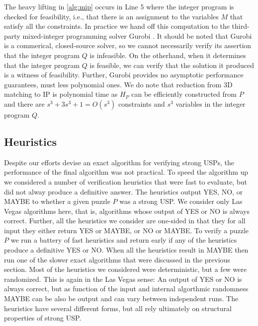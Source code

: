 \documentclass[11pt]{article}
\begin{document}
The heavy lifting in \autoref{alg:mip} occurs in Line 5 where the
integer program is checked for feasibility, i.e., that there is an
assignment to the variables $M$ that satisfy all the constraints.  In
practice we hand off this computation to the third-party mixed-integer
programming solver Gurobi \cite{gurobi}.  It should be noted that
Gurobi is a commerical, closed-source solver, so we cannot necessarily
verify its assertion that the integer program $Q$ is infeasible.  On
the otherhand, when it determines that the integer program $Q$ is
feasible, we can verify that the solution it produced is a witness of
feasibility.  Further, Gurobi provides no asymptotic performance
guarantees, must less polynomial ones.  We do note that reduction from
3D matching to IP is polynomial time as $H_P$ can be efficiently
constructed from $P$ and there are $s^3 + 3s^3 + 1 = O(s^3)$
constraints and $s^3$ variables in the integer program $Q$.
 
\label{subsec:mip}




\subsection{Heuristics}
\label{sec:heuristic}

Despite our efforts devise an exact algorithm for verifying strong
USPs, the performance of the final algorithm was not practical.  To
speed the algorithm up we considered a number of verification
heuristics that were fast to evaluate, but did not alway produce a
definitive answer.  The heuristics output YES, NO, or MAYBE to whether
a given puzzle $P$ was a strong USP.  We consider only Las Vegas
algorithms here, that is, algorithms whose output of YES or NO is
always correct.  Further, all the heuristics we consider are one-sided
in that they for all input they either return YES or MAYBE, or NO or
MAYBE.  To verify a puzzle $P$ we run a battery of fast heuristics and
return early if any of the heuristics produce a definitive YES or NO.
When all the heuristics result in MAYBE then run one of the slower
exact algorithms that were discussed in the previous section.  Most of
the heuristics we considered were deterministic, but a few were
randomized.  This is again in the Las Vegas sense: An output of YES or
NO is always correct, but as function of the input and internal
algorthmic randomness MAYBE can be also be output and can vary between
independent runs.  The heuristics have several different forms, but
all rely ultimately on structural properties of strong USP.
\end{document}
